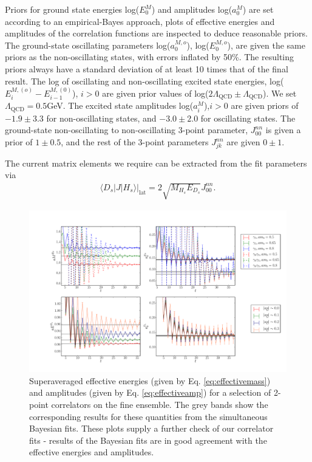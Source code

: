 Priors for ground state energies log($E_0^M$) and amplitudes log($a_0^M$) are set according to an empirical-Bayes approach, plots of effective energies and amplitudes of the correlation functions are inspected to deduce reasonable priors. The ground-state oscillating parameters log($a_0^{M,o}$), log($E_0^{M,o}$), are given the same priors as the non-oscillating states, with errors inflated by 50\%. The resulting priors always have a standard deviation of at least 10 times that of the final result. The log of oscillating and non-oscillating excited state energies, log($E_i^{M,(o)}-E_{i-1}^{M,(0)}$), $i>0$ are given prior values of log($2\Lambda_{\text{QCD}}\pm \Lambda_{\text{QCD}}$). We set $\Lambda_{\text{QCD}}=0.5$GeV. The excited state amplitudes log($a_i^M$),$i>0$ are given priors of $-1.9\pm 3.3$ for non-oscillating states, and $-3.0\pm 2.0$ for oscillating states. The ground-state non-oscillating to non-oscillating 3-point parameter, $J_{00}^{nn}$ is given a prior of $1\pm 0.5$, and the rest of the 3-point parameters $J_{jk}^{nn}$ are given $0\pm 1$.

The current matrix elements we require can be extracted from the fit parameters via
\begin{align}
  \langle D_s| J | H_s \rangle |_{\text{lat}} = 2 \sqrt{M_{H_s}E_{D_s}} J^{nn}_{00}.
  \label{eq:currentfit}
\end{align}

\begin{figure}[htb!]
  \hspace{-30pt}
    \hspace{-10pt}
    \includegraphics[width=1.2\textwidth]{images/BsDs/fine_2pt_summary.pdf}
    \caption{
Superaveraged effective energies (given by Eq. \eqref{eq:effectivemass}) and amplitudes (given by Eq. \eqref{eq:effectiveamp}) for a selection of 2-point correlators on the fine ensemble. The grey bands show the corresponding results for these quantities from the simultaneous Bayesian fits. These plots supply a further check of our correlator fits - results of the Bayesian fits are in good agreement with the effective energies and amplitudes.  \label{fig:2ptcorrs_BsDs}}
\end{figure}

